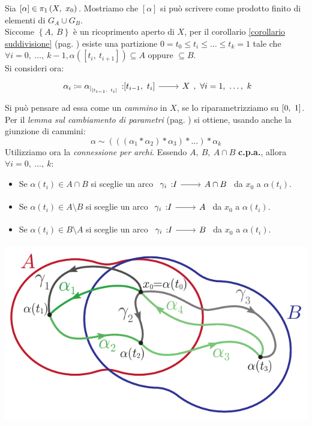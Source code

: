 \begin{demonstration}
	Sia $[\alpha]\in\gruf{X}{x_0}$. Mostriamo che $[\alpha]$ si può scrivere come prodotto finito di elementi di $G_A\cup G_B$.\\
	Siccome $\left\{A,\ B\right\}$ è un ricoprimento aperto di $X$, per il corollario \ref{corollario suddivisione} (pag. \pageref{corollario suddivisione}) esiste una partizione $0=t_0\leq t_i\leq\dots\leq t_k=1$ tale che $\forall i=0,\ \dots,\ k-1, \alpha([t_i,\ t_{i+1}]) \subseteq A$ oppure $\subseteq B$. \\
	Si consideri ora:
	\begin{equation*}
		\funz {\alpha_i\coloneqq \alpha_{\mid_{[t_{i-1},\ t_i]}}} {[t_{i-1},\ t_i]} X,\ \forall i=1,\ \dots,\ k
	\end{equation*}
	Si può pensare ad essa come un \textit{cammino} in $X$, se lo riparametrizziamo su $\left[0,\ 1\right]$. Per il \textit{lemma  sul cambiamento di parametri} (pag. \pageref{cambiamentodiparametri}) si ottiene, usando anche la giunzione di cammini:
	\begin{equation*}
		\alpha\sim \left( \left( (\alpha_1 \ast \alpha_2)\ast \alpha_3 \right)\ast \ldots\right) \ast \alpha_k
	\end{equation*}
	Utilizziamo ora la \textit{connessione per archi}. Essendo $A,\ B,\ A\cap B$ \textbf{c.p.a.}, allora $\forall i=0,\ \dots,\ k$:
		\begin{itemize}
			\item Se $\alpha(t_i)\in A\cap B$ si sceglie un arco $\funz {\gamma_i} I {A\cap B}$ da $x_0$ a $\alpha(t_i)$.
			\item Se $\alpha(t_i)\in A\setminus B$ si sceglie un arco $\funz {\gamma_i} I {A}$ da $x_0$ a $\alpha(t_i)$.
			\item Se $\alpha(t_i)\in B\setminus A$ si sceglie un arco $\funz {\gamma_i} I {B}$ da $x_0$ a $\alpha(t_i)$.
		\end{itemize}
		\begin{center}
		\includegraphics[trim=0cm 0cm 0cm 0.2cm,clip,scale=0.8]{images/vankampenpaths.pdf}

\end{center}
\end{demonstration}
